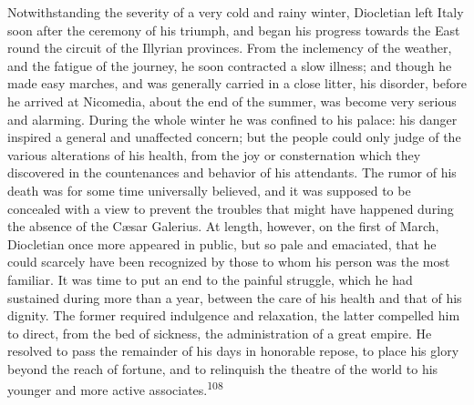 Notwithstanding the severity of a very cold and rainy winter,
Diocletian left Italy soon after the ceremony of his triumph, and
began his progress towards the East round the circuit of the
Illyrian provinces. From the inclemency of the weather, and the
fatigue of the journey, he soon contracted a slow illness; and
though he made easy marches, and was generally carried in a close
litter, his disorder, before he arrived at Nicomedia, about the
end of the summer, was become very serious and alarming. During
the whole winter he was confined to his palace: his danger
inspired a general and unaffected concern; but the people could
only judge of the various alterations of his health, from the joy
or consternation which they discovered in the countenances and
behavior of his attendants. The rumor of his death was for some
time universally believed, and it was supposed to be concealed
with a view to prevent the troubles that might have happened
during the absence of the Cæsar Galerius. At length, however, on
the first of March, Diocletian once more appeared in public, but
so pale and emaciated, that he could scarcely have been
recognized by those to whom his person was the most familiar. It
was time to put an end to the painful struggle, which he had
sustained during more than a year, between the care of his health
and that of his dignity. The former required indulgence and
relaxation, the latter compelled him to direct, from the bed of
sickness, the administration of a great empire. He resolved to
pass the remainder of his days in honorable repose, to place his
glory beyond the reach of fortune, and to relinquish the theatre
of the world to his younger and more active associates.\textsuperscript{108}



